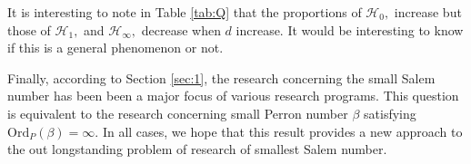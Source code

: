 \documentclass[12pt]{article}
\theoremstyle{plain}
\theoremstyle{remark}
\newcommand{\OrdP}{\mathrm{Ord}_{P}}
\begin{document}
It is interesting to note in Table \ref{tab:Q} that the 
     proportions of $\mathcal{H}_0, $ increase but those     
    of $\mathcal{H}_1, $ and $\mathcal{H}_\infty, $ decrease when $d$ increase.
It would be interesting to know if this is a general phenomenon or not.

 Finally, according to Section \ref{sec:1}, the research concerning the small Salem number has been been a major focus of various research programs. This question is equivalent to the research concerning small Perron number $\beta$ satisfying $\OrdP(\beta)=\infty$. %
 In all cases, we hope that this result provides a new approach to the out longstanding problem of research of smallest Salem number.

\end{document}
